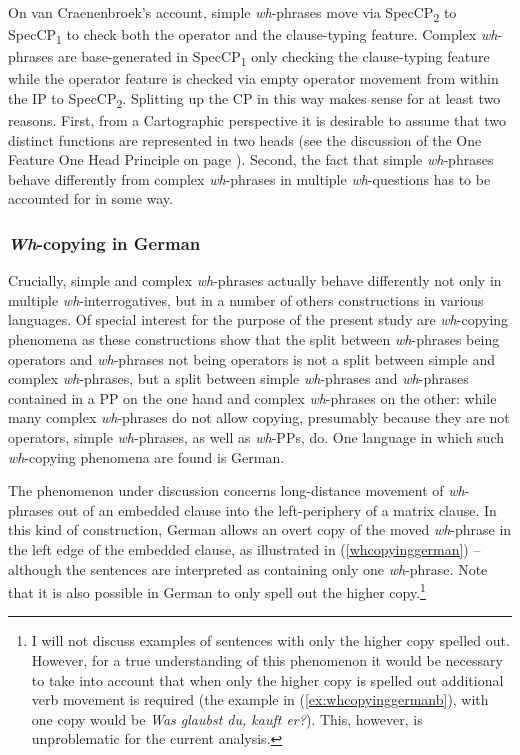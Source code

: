 On van Craenenbroek's account, simple \textit{wh}-phrases move via SpecCP\textsubscript{2} to SpecCP\textsubscript{1} to check both the operator and the clause-typing feature. Complex \textit{wh}-phrases are base-generated in SpecCP\textsubscript{1} only checking the clause-typing feature while the operator feature is checked via \label{emptyoperator}empty operator movement from within the IP to SpecCP\textsubscript{2}. Splitting up the CP in this way makes sense for at least two reasons. First, from a Cartographic perspective it is desirable to assume that two distinct functions are represented in two heads (see the discussion of the One Feature One Head Principle on page \pageref{ofoh}). Second, the fact that simple \textit{wh}-phrases behave differently from complex \textit{wh}-phrases in multiple \textit{wh}-questions has to be accounted for in some way.

\subsubsection{\textit{Wh}-copying in German}
Crucially, simple and complex \textit{wh}-phrases actually behave differently not only in multiple \textit{wh}-interrogatives, but in a number of others constructions in various languages. Of special interest for the purpose of the present study are \textit{wh}-copying phenomena as these constructions show that the split between \textit{wh}-phrases being operators and \textit{wh}-phrases not being operators is not a split between simple and complex \textit{wh}-phrases, but a split between simple \textit{wh}-phrases and \textit{wh}-phrases contained in a PP on the one hand and complex \textit{wh}-phrases on the other: while many complex \textit{wh}-phrases do not allow copying, presumably because they are not operators, simple \textit{wh}-phrases, as well as \textit{wh}-PPs, do. One language in which such \textit{wh}-copying phenomena are found is German.

The phenomenon under discussion concerns long-distance movement of \textit{wh}-phrases out of an embedded clause into the left-periphery of a matrix clause. In this kind of construction, German allows an overt copy of the moved \textit{wh}-phrase in the left edge of the embedded clause, as illustrated in (\ref{whcopyinggerman}) -- although the sentences are interpreted as containing only one \textit{wh}-phrase. Note that it is also possible in German to only spell out the higher copy.\footnote{ I will not discuss examples of sentences with only the higher copy spelled out. However, for a true understanding of this phenomenon it would be necessary to take into account that when only the higher copy is spelled out additional verb movement is required (the example in (\ref{ex:whcopyinggermanb}), with one copy would be \textit{Was glaubst du, kauft er?}). This, however, is unproblematic for the current analysis.\label{footnotewh}} 

